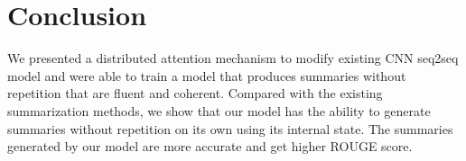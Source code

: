 \section{Conclusion}
\label{sec:conclude}
We presented a distributed attention mechanism to modify existing CNN seq2seq model 
and were able to train a model that produces 
summaries without repetition that are fluent and coherent. 
Compared with the existing summarization methods, we show that our model has the ability to 
generate summaries without repetition on its own using its internal state.
The summaries generated by our model are more accurate and get higher ROUGE score. 
